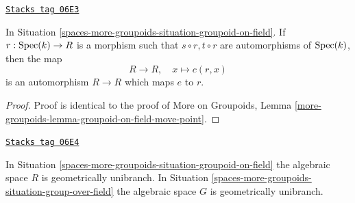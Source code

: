 \begin{lemma}
\label{spaces-more-groupoids-lemma-groupoid-on-field-move-point}
\href{https://stacks.math.columbia.edu/tag/06E3}{\texttt{Stacks tag 06E3}}

In
Situation \ref{spaces-more-groupoids-situation-groupoid-on-field}.
If $r : \operatorname{Spec}(k) \to R$ is a morphism such that
$s \circ r, t \circ r$ are automorphisms of $\operatorname{Spec}(k)$, then the map
$$
R \longrightarrow R, \quad
x \longmapsto c(r, x)
$$
is an automorphism $R \to R$ which maps $e$ to $r$.
\end{lemma}

\begin{proof}
Proof is identical to the proof of
More on Groupoids,
Lemma \ref{more-groupoids-lemma-groupoid-on-field-move-point}.
\end{proof}

\begin{lemma}
\label{spaces-more-groupoids-lemma-groupoid-on-field-geometrically-irreducible}
\href{https://stacks.math.columbia.edu/tag/06E4}{\texttt{Stacks tag 06E4}}

In
Situation \ref{spaces-more-groupoids-situation-groupoid-on-field}
the algebraic space $R$ is geometrically unibranch. In
Situation \ref{spaces-more-groupoids-situation-group-over-field}
the algebraic space $G$ is geometrically unibranch.
\end{lemma}

